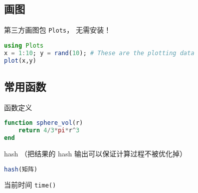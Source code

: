 \subsection{画图}
第三方画图包 \verb|Plots|， 无需安装！
\begin{lstlisting}[language=Julia]
using Plots
x = 1:10; y = rand(10); # These are the plotting data
plot(x,y)
\end{lstlisting}

\subsection{常用函数}
函数定义
\begin{lstlisting}[language=Julia]
function sphere_vol(r)
    return 4/3*pi*r^3
end
\end{lstlisting}

hash （把结果的 hash 输出可以保证计算过程不被优化掉）
\begin{lstlisting}[language=Julia]
hash(矩阵)
\end{lstlisting}

当前时间 \verb|time()|
